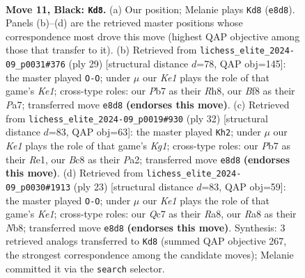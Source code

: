 \documentclass[11pt]{article}
\begin{document}
\clearpage

\begin{figure}[p]\centering
\begin{subfigure}{0.46\textwidth}\centering
\resizebox{\linewidth}{!}{%
\newchessgame
\chessboard[
  setfen={r1b1kb1r/ppq2ppp/2p1p3/3nN3/Q2P4/3BP3/PP3PPP/R1B1K2R b KQkq - 3 11},
  showmover=false,
  pgfstyle=straightmove, color=movearrow, markmove={e8-d8}
]}
\caption{}
\end{subfigure}\hfill
\begin{subfigure}{0.46\textwidth}\centering
\resizebox{\linewidth}{!}{%
\newchessgame
\chessboard[
  setfen={r1b1k2r/p1q1ppb1/2p1n1p1/4N2p/2P2P1Q/1PN5/P5PP/R1B1R1K1 b kq - 0 15},
  showmover=false,
  pgfstyle=straightmove, color=movearrow, markmove={e8-g8}
]}
\caption{}
\end{subfigure}
\\[4pt]
\begin{subfigure}{0.46\textwidth}\centering
\resizebox{\linewidth}{!}{%
\newchessgame
\chessboard[
  setfen={r1bqr1k1/1p4pp/2p2p2/p1bnP3/2N5/2P3PP/PP2QPB1/R1B1R1K1 w - - 2 17},
  showmover=false,
  pgfstyle=straightmove, color=movearrow, markmove={g1-h2}
]}
\caption{}
\end{subfigure}\hfill
\begin{subfigure}{0.46\textwidth}\centering
\resizebox{\linewidth}{!}{%
\newchessgame
\chessboard[
  setfen={rnbqk2r/1p2b1pp/p2p1p2/1N1Pp3/8/Q7/PPPB1PPP/R3KB1R b KQkq - 1 12},
  showmover=false,
  pgfstyle=straightmove, color=movearrow, markmove={e8-g8}
]}
\caption{}
\end{subfigure}
\caption{\textbf{Move 11, Black: \texttt{Kd8}.} (a) Our position; Melanie plays \texttt{Kd8} (\texttt{e8d8}). Panels (b)--(d) are the retrieved master positions whose correspondence most drove this move (highest QAP objective among those that transfer to it). (b) Retrieved from \texttt{lichess\_elite\_2024-09\_p0031\#376} (ply 29) [structural distance $d$=78, QAP obj=145]: the master played \texttt{O-O}; under $\mu$ our \emph{Ke1} plays the role of that game's \emph{Ke1}; cross-type roles: our \emph{P}b7 as their \emph{R}h8, our \emph{B}f8 as their \emph{P}a7; transferred move \texttt{e8d8} \textbf{(endorses this move)}. (c) Retrieved from \texttt{lichess\_elite\_2024-09\_p0019\#930} (ply 32) [structural distance $d$=83, QAP obj=63]: the master played \texttt{Kh2}; under $\mu$ our \emph{Ke1} plays the role of that game's \emph{Kg1}; cross-type roles: our \emph{P}b7 as their \emph{R}e1, our \emph{B}c8 as their \emph{P}a2; transferred move \texttt{e8d8} \textbf{(endorses this move)}. (d) Retrieved from \texttt{lichess\_elite\_2024-09\_p0030\#1913} (ply 23) [structural distance $d$=83, QAP obj=59]: the master played \texttt{O-O}; under $\mu$ our \emph{Ke1} plays the role of that game's \emph{Ke1}; cross-type roles: our \emph{Q}c7 as their \emph{R}a8, our \emph{R}a8 as their \emph{N}b8; transferred move \texttt{e8d8} \textbf{(endorses this move)}. Synthesis: 3 retrieved analogs transferred to \texttt{Kd8} (summed QAP objective 267, the strongest correspondence among the candidate moves); Melanie committed it via the \texttt{search} selector.}
\label{fig:thought-m21}
\end{figure}
\end{document}
